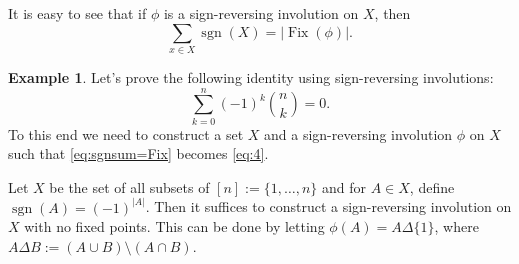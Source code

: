 \documentclass[oneside]{book}
\numberwithin{equation}{section}
\theoremstyle{definition}
\newtheorem{exam}[thm]{Example}
\newcommand\Fix{\operatorname{Fix}}
\newcommand\sgn{\operatorname{sgn}}
\begin{document}
It is easy to see that if \( \phi \) is a sign-reversing involution on
\( X \), then
\begin{equation}\label{eq:sgnsum=Fix}
  \sum_{x\in X} \sgn(X) = |\Fix(\phi)|.
\end{equation}

\begin{exam}
  Let's prove the following identity using sign-reversing involutions:
  \begin{equation}\label{eq:4}
    \sum_{k=0}^{n} (-1)^{k} \binom{n}{k} = 0.
  \end{equation}
  To this end we need to construct a set \( X \) and a sign-reversing
  involution \( \phi \) on \( X \) such that \eqref{eq:sgnsum=Fix}
  becomes \eqref{eq:4}.

  Let \( X \) be the set of all subsets of \( [n]:= \{ 1,\dots,n \} \)
  and for \( A\in X \), define \( \sgn(A) = (-1)^{|A|} \). Then it
  suffices to construct a sign-reversing involution on \( X \) with no
  fixed points. This can be done by letting
  \( \phi(A) = A \Delta \{1\} \), where
  \( A \Delta B := (A \cup B) \setminus (A \cap B) \).
\end{exam}
\end{document}
